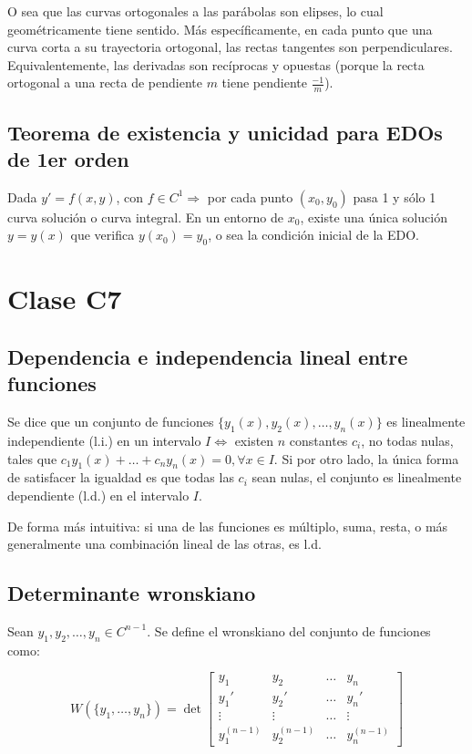 \documentclass{article}
\begin{document}
O sea que las curvas ortogonales a las parábolas son elipses, lo cual geométricamente tiene sentido. Más específicamente, en cada punto que una curva corta a su trayectoria ortogonal, las rectas tangentes son perpendiculares. Equivalentemente, las derivadas son recíprocas y opuestas (porque la recta ortogonal a una recta de pendiente $m$ tiene pendiente $\frac{-1}{m}$).

\subsection{Teorema de existencia y unicidad para EDOs de 1er orden}

Dada $y' = f(x,y)$, con $f \in C^1 \Rightarrow$ por cada punto $(x_0, y_0)$ pasa 1 y sólo 1 curva solución o curva integral. En un entorno de $x_0$, existe una única solución $y = y(x)$ que verifica $y(x_0) = y_0$, o sea la condición inicial de la EDO.

\section{Clase C7}

\subsection{Dependencia e independencia lineal entre funciones}

Se dice que un conjunto de funciones $\{y_1(x), y_2(x), \ldots, y_n(x) \}$ es linealmente independiente (l.i.) en un intervalo $I \Leftrightarrow$ existen $n$ constantes $c_i$, no todas nulas, tales que $c_1 y_1(x) + \ldots + c_n y_n(x) = 0, \forall x \in I$. Si por otro lado, la única forma de satisfacer la igualdad es que todas las $c_i$ sean nulas, el conjunto es linealmente dependiente (l.d.) en el intervalo $I$.

De forma más intuitiva: si una de las funciones es múltiplo, suma, resta, o más generalmente una combinación lineal de las otras, es l.d.

\subsection{Determinante wronskiano}

Sean $y_1, y_2, \ldots, y_n \in C^{n-1}$. Se define el wronskiano del conjunto de funciones como:

\begin{equation}
W(\{y_1, \ldots, y_n\}) = \det
\begin{bmatrix}
y_1 & y_2 & \ldots & y_n \\
y_1' & y_2' & \ldots & y_n' \\
\vdots & \vdots & \ldots & \vdots \\
y_1^{(n-1)} & y_2^{(n-1)} & \ldots & y_n^{(n-1)}
\end{bmatrix}
\end{equation}
\end{document}
